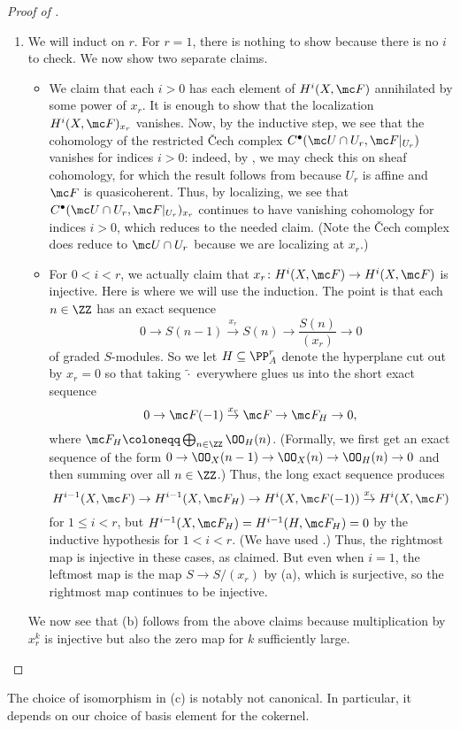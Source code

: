 \documentclass[../notes.tex]{subfiles}
\begin{document}
\begin{proof}[Proof of ]
\begin{enumerate}[label=(\alph*)]
		\[x_0^{m_0}\cdots x_r^{m_r}\cdot x_0^{-m_0-1}\cdots x_r^{-m_r-1}=x_0^{-1}\cdots x_r^{-1},\]
		which is the basis element of $H^r(X,\OO_X(-r-1))$. Then for any other basis element $x_0^{\ell_0}\cdots x_r^{\ell_r}\in H^r(X,\OO_X(-r-1-n))$, the only way for the pairing to send this to a nonzero element is for $m_i+\ell_i<0$ for each $\ell_i$, meaning that $\ell_i\le-m_i-1$ for each $i$, but then $\sum_im_i=n$ and $\sum_i\ell_i=-r-1-n$ forces equality everywhere.

		\setcounter{enumi}{1}
		\item We will induct on $r$. For $r=1$, there is nothing to show because there is no $i$ to check. We now show two separate claims.
		\begin{itemize}
			\item We claim that each $i>0$ has each element of $H^i(X,\mc F)$ annihilated by some power of $x_r$. It is enough to show that the localization $H^i(X,\mc F)_{x_r}$ vanishes. Now, by the inductive step, we see that the cohomology of the restricted \v Cech complex $C^\bullet(\mc U\cap U_r,\mc F|_{U_r})$ vanishes for indices $i>0$: indeed, by , we may check this on sheaf cohomology, for which the result follows from  because $U_r$ is affine and $\mc F$ is quasicoherent. Thus, by localizing, we see that $C^\bullet(\mc U\cap U_r,\mc F|_{U_r})_{x_r}$ continues to have vanishing cohomology for indices $i>0$, which reduces to the needed claim. (Note the \v Cech complex does reduce to $\mc U\cap U_r$ because we are localizing at $x_r$.)
			\item For $0<i<r$, we actually claim that $x_r\colon H^i(X,\mc F)\to H^i(X,\mc F)$ is injective. Here is where we will use the induction. The point is that each $n\in\ZZ$ has an exact sequence
			\[0\to S(n-1)\stackrel{x_r}\to S(n)\to\frac {S(n)}{(x_r)}\to0\]
			of graded $S$-modules. So we let $H\subseteq\PP^r_A$ denote the hyperplane cut out by $x_r=0$ so that taking $\widetilde\cdot$ everywhere glues us into the short exact sequence
			\[0\to\mc F(-1)\stackrel{x_r}\to\mc F\to\mc F_H\to0,\]
			where $\mc F_H\coloneqq\bigoplus_{n\in\ZZ}\OO_H(n)$. (Formally, we first get an exact sequence of the form $0\to\OO_X(n-1)\to\OO_X(n)\to\OO_H(n)\to0$ and then summing over all $n\in\ZZ$.) Thus, the long exact sequence produces
			\[H^{i-1}(X,\mc F)\to H^{i-1}(X,\mc F_H)\to H^i(X,\mc F(-1))\stackrel{x_r}\to H^i(X,\mc F)\]
			for $1\le i<r$, but $H^{i-1}(X,\mc F_H)=H^{i-1}(H,\mc F_H)=0$ by the inductive hypothesis for $1<i<r$. (We have used .) Thus, the rightmost map is injective in these cases, as claimed. But even when $i=1$, the leftmost map is the map $S\to S/(x_r)$ by (a), which is surjective, so the rightmost map continues to be injective.
		\end{itemize}
		We now see that (b) follows from the above claims because multiplication by $x_r^k$ is injective but also the zero map for $k$ sufficiently large.
		\qedhere
	\end{enumerate}
\end{proof}
\begin{remark}
	The choice of isomorphism in (c) is notably not canonical. In particular, it depends on our choice of basis element for the cokernel.
\end{remark}
\end{document}
